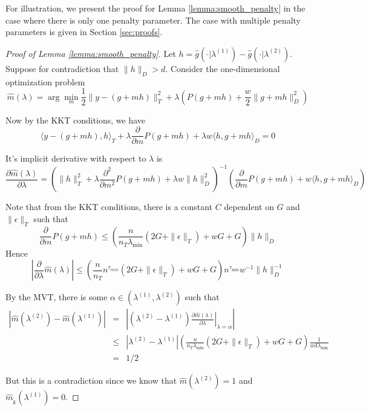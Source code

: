 \documentclass[12pt]{article}
\begin{document}
For illustration, we present the proof for Lemma \ref{lemma:smooth_penalty} in the case where there is only one penalty parameter. The case with multiple penalty parameters is given in Section \ref{sec:proofs}.

\begin{proof}[Proof of Lemma \ref{lemma:smooth_penalty}]

Let $h=\hat{g}(\cdot|\lambda^{(1)})-\hat{g}(\cdot|\lambda^{(2)})$. Suppose for contradiction that $\|h\|_{D} > d$. 
Consider the one-dimensional optimization problem
\[
\hat{m}(\lambda) = \arg\min_{m}\frac{1}{2}\|y- \left(g +mh\right)\|_{T}^{2}+\lambda\left(P(g+mh)+\frac{w}{2}\|g+mh\|_{D}^{2}\right)
\]

Now by the KKT conditions, we have
\[
\langle y-\left(g+mh\right),h\rangle_{T}+\lambda\frac{\partial}{\partial m}P(g+mh)+\lambda w \langle h,g+mh\rangle_{D}=0
\]


It's implicit derivative with respect to $\lambda$ is
\begin{equation}
\frac{\partial\hat{m}(\lambda)}{\partial\lambda} = 
\left ( \| h\|_{T}^2 +\lambda\frac{\partial^{2}}{\partial m^{2}}P(g+mh) +\lambda w\|h\|_{D}^{2} \right )^{-1}
\left ( \frac{\partial}{\partial m}P(g+mh)+w\langle h,g+mh\rangle_{D} \right )
\end{equation}

Note that from the KKT conditions, there is a constant $C$ dependent on $G$ and $\|\epsilon \|_T$ such that
\[ 
\frac{\partial}{\partial m}P(g+mh) \le \left(\frac{n}{n_{T} \lambda_{\min}}\left(2G+\|\epsilon\|_{T}\right)+wG+G\right)  \|h\|_{D}
\]
Hence
\[
\left|\frac{\partial}{\partial\lambda}\hat{m}(\lambda)\right| \le
\left(\frac{n}{n_{T}}n^{\tau_{min}}\left(2G+\|\epsilon\|_{T}\right)+wG+G\right)n^{\tau_{\min}}w^{-1}\|h\|_{D}^{-1}
\]

By the MVT, there is some $\alpha\in (\lambda^{(1)},\lambda^{(2)})$ such that 
\begin{eqnarray*}
\left|\hat{m}(\lambda^{(2)})-\hat{m}(\lambda^{(1)})\right| & = & 
\left|\left ( \lambda^{(2)}-\lambda^{(1)} \right ) 
\left . \frac{\partial \hat{m}(\lambda) }{\partial\lambda}\right |_{\lambda=\alpha} \right|\\
 & \le & |\lambda^{(2)}-\lambda^{(1)}|
\left(\frac{n}{n_{T} \lambda_{\min} }\left(2G+\|\epsilon\|_{T}\right)+wG+G\right)\frac{1}{wd \lambda_{\min} } \\
 & = & 1/2
\end{eqnarray*}


But this is a contradiction since we know that $\hat{m}(\lambda^{(2)})=1$
and $\hat{m}_{\tilde{k}}(\lambda^{(1)})=0$.
\end{proof}
\end{document}
